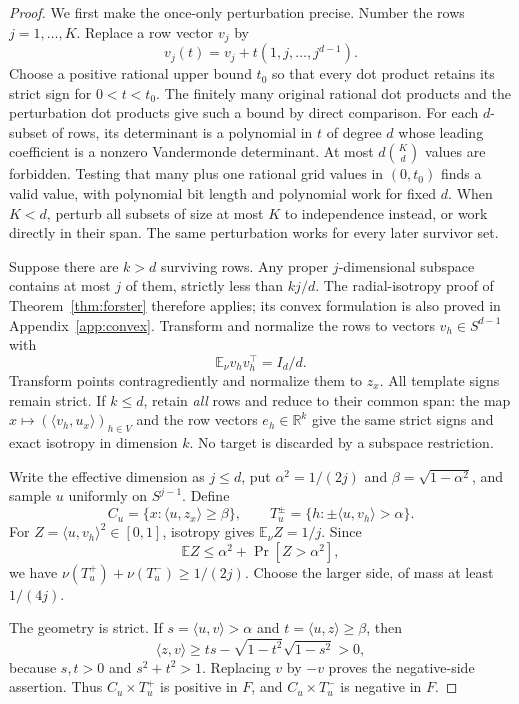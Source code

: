 \documentclass[11pt]{article}
\newcommand{\R}{\mathbb R}
\newcommand{\E}{\mathbb E}
\newcommand{\1}{\mathbf 1}
\begin{document}
\begin{proof}
We first make the once-only perturbation precise. Number the rows $j=1,\ldots,K$. Replace a row vector $v_j$ by
\[
 v_j(t)=v_j+t(1,j,\ldots,j^{d-1}).
\]
Choose a positive rational upper bound $t_0$ so that every dot product retains its strict sign for $0<t<t_0$. The finitely many original rational dot products and the perturbation dot products give such a bound by direct comparison. For each $d$-subset of rows, its determinant is a polynomial in $t$ of degree $d$ whose leading coefficient is a nonzero Vandermonde determinant. At most $d\binom Kd$ values are forbidden. Testing that many plus one rational grid values in $(0,t_0)$ finds a valid value, with polynomial bit length and polynomial work for fixed $d$. When $K<d$, perturb all subsets of size at most $K$ to independence instead, or work directly in their span. The same perturbation works for every later survivor set.

Suppose there are $k>d$ surviving rows. Any proper $j$-dimensional subspace contains at most $j$ of them, strictly less than $kj/d$. The radial-isotropy proof of Theorem~\ref{thm:forster} therefore applies; its convex formulation is also proved in Appendix~\ref{app:convex}. Transform and normalize the rows to vectors $v_h\in S^{d-1}$ with
\[
 \E_\nu v_hv_h^\top=I_d/d.
\]
Transform points contragrediently and normalize them to $z_x$. All template signs remain strict. If $k\le d$, retain \emph{all} rows and reduce to their common span: the map $x\mapsto (\langle v_h,u_x\rangle)_{h\in V}$ and the row vectors $e_h\in\R^k$ give the same strict signs and exact isotropy in dimension $k$. No target is discarded by a subspace restriction.

Write the effective dimension as $j\le d$, put $\alpha^2=1/(2j)$ and $\beta=\sqrt{1-\alpha^2}$, and sample $u$ uniformly on $S^{j-1}$. Define
\[
 C_u=\{x:\langle u,z_x\rangle\ge\beta\},\qquad
 T_u^\pm=\{h:\pm\langle u,v_h\rangle>\alpha\}.
\]
For $Z=\langle u,v_h\rangle^2\in[0,1]$, isotropy gives $\E_\nu Z=1/j$. Since
\[
 \E Z\le\alpha^2+\Pr[Z>\alpha^2],
\]
we have $\nu(T_u^+)+\nu(T_u^-)\ge1/(2j)$. Choose the larger side, of mass at least $1/(4j)$.

The geometry is strict. If $s=\langle u,v\rangle>\alpha$ and $t=\langle u,z\rangle\ge\beta$, then
\[
 \langle z,v\rangle\ge ts-\sqrt{1-t^2}\sqrt{1-s^2}>0,
\]
because $s,t>0$ and $s^2+t^2>1$. Replacing $v$ by $-v$ proves the negative-side assertion. Thus $C_u\times T_u^+$ is positive in $F$, and $C_u\times T_u^-$ is negative in $F$.


\end{proof}
\end{document}
